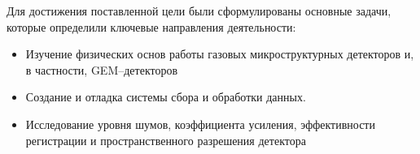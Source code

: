 Для достижения поставленной цели были сформулированы основные задачи, которые определили ключевые направления деятельности:
\begin{itemize}
    
    \item Изучение физических основ работы газовых микроструктурных детекторов и, в частности, GEM--детекторов
    \item Создание и отладка системы сбора и обработки данных.
    \item Исследование уровня шумов, коэффициента усиления, эффективности регистрации и пространственного разрешения детектора 
	
\end{itemize}